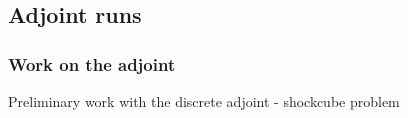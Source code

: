 \documentclass{beamer}
\begin{document}
\subsection{Adjoint runs}
\begin{frame}
\frametitle{Work on the adjoint}
\begin{minipage}[t][1\textheight]{1\textwidth}
\vspace{-20pt}
\begin{exampleblock}{Preliminary work with the discrete adjoint - shockcube problem}
\vspace{-20pt}
\tiny
\begin{figure}
\label{fig:shockedcube}
\centering
{}

\end{figure}
\end{exampleblock}
\end{minipage}
\end{frame}
\end{document}
